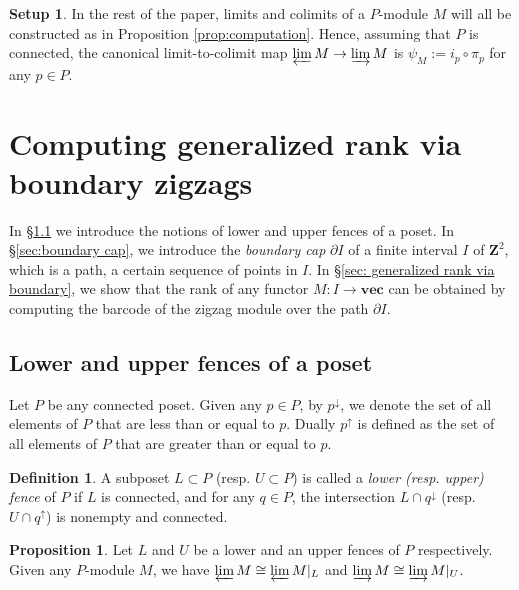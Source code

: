 \documentclass[11pt]{article}
\theoremstyle{definition}
\newtheorem{proposition}[theorem]{Proposition}
\newtheorem{definition}[theorem]{Definition}
\newtheorem{setup}[]{Setup}
\newcommand{\Pb}{P}
\newcommand{\vect}{\mathbf{vec}}
\newcommand{\Z}{\mathbf{Z}}
\begin{document}
\begin{framed}
\begin{setup}\label{convention}
In the rest of the paper, limits and colimits of a $\Pb$-module $M$ will all be constructed as in Proposition \ref{prop:computation}. Hence, assuming that $\Pb$ is connected, the canonical limit-to-colimit map $\varprojlim M \rightarrow \varinjlim M$ is $\psi_{M}:= i_p\circ \pi_p$ for any $p\in \Pb$. 

\end{setup} 
\end{framed}

\section{Computing generalized rank via boundary zigzags}\label{sec:generalized rank via boundary zigzag}
In \S \ref{sec:lower and upper fences} we introduce the notions of lower and upper fences of a poset. In \S \ref{sec:boundary cap}, we introduce the \emph{boundary cap} $\partial I$ of a finite interval $I$ of $\Z^2$, which is a path, a certain sequence of points in $I$. In \S\ref{sec: generalized rank via boundary}, we show that the rank of any functor $M:I\rightarrow \vect$ can be obtained by computing the barcode of the zigzag module over the path $\partial I$.


\subsection{Lower and upper fences of a poset}\label{sec:lower and upper fences}

Let $P$ be any connected poset. Given any $p\in P$, by $p^{\downarrow}$, we denote the set of all elements of $P$ that are less than or equal to $p$. Dually $p^{\uparrow}$ is defined as the set of all elements of $P$ that are greater than or equal to $p$. 

\begin{definition}\label{def:fences} A subposet $L\subset P$ (resp. $U\subset P$) is called a \emph{lower (resp. upper) fence} of $P$ if $L$ is connected, and for any $q\in P$, the intersection $L\cap q^{\downarrow}$ (resp. $U\cap q^{\uparrow}$) is nonempty and connected.
\end{definition}

\begin{proposition}\label{prop:section extension}\label{prop:commute}
Let $L$ and $U$ be a lower and an upper fences of $P$ respectively. Given any $P$-module $M$, we have
$\varprojlim M \cong \varprojlim M|_{L}$ and $\varinjlim M \cong \varinjlim M|_{U}$.
\end{proposition}
\end{document}
